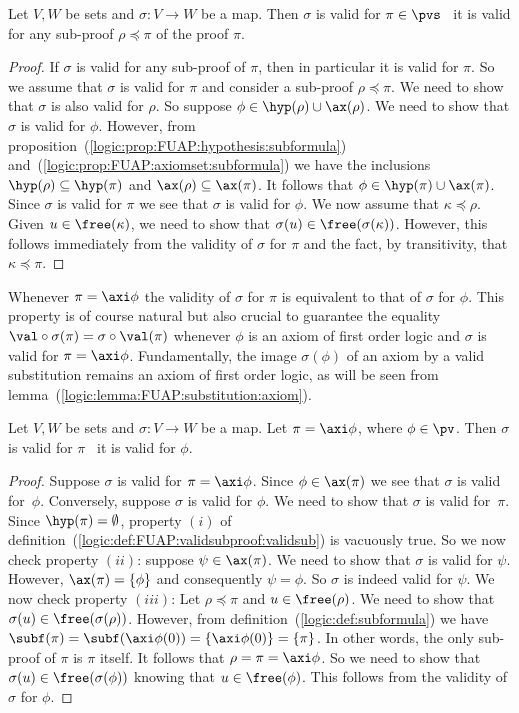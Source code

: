 \begin{prop}\label{logic:prop:FUAP:validsubproof:subformula}
Let $V, W$ be sets and $\sigma:V\to W$ be a map. Then $\sigma$ is
valid for $\pi\in\pvs$ \ifand\ it is valid for any sub-proof
$\rho\preceq\pi$ of the proof $\pi$.
\end{prop}
\begin{proof}
If $\sigma$ is valid for any sub-proof of $\pi$, then in particular
it is valid for $\pi$. So we assume that $\sigma$ is valid for $\pi$
and consider a sub-proof $\rho\preceq\pi$. We need to show that
$\sigma$ is also valid for $\rho$. So suppose
$\phi\in\hyp(\rho)\cup\ax(\rho)$. We need to show that $\sigma$ is
valid for $\phi$. However, from
proposition~(\ref{logic:prop:FUAP:hypothesis:subformula})
and~(\ref{logic:prop:FUAP:axiomset:subformula}) we have the
inclusions $\hyp(\rho)\subseteq\hyp(\pi)$  and
$\ax(\rho)\subseteq\ax(\pi)$. It follows that
$\phi\in\hyp(\pi)\cup\ax(\pi)$. Since $\sigma$ is valid for $\pi$ we
see that $\sigma$ is valid for $\phi$. We now assume that
$\kappa\preceq\rho$. Given $u\in\free(\kappa)$, we need to show that
$\sigma(u)\in\free(\sigma(\kappa))$. However, this follows
immediately from the validity of $\sigma$ for $\pi$ and the fact, by
transitivity, that $\kappa\preceq\pi$.
\end{proof}

Whenever $\pi=\axi\phi$ the validity of $\sigma$ for $\pi$ is
equivalent to that of $\sigma$ for $\phi$. This property is of
course natural but also crucial to guarantee the equality
$\val\circ\sigma(\pi)=\sigma\circ\val(\pi)$ whenever $\phi$ is an
axiom of first order logic and $\sigma$ is valid for $\pi=\axi\phi$.
Fundamentally, the image $\sigma(\phi)$ of an axiom by a valid
substitution remains an axiom of first order logic, as will be seen
from lemma~(\ref{logic:lemma:FUAP:substitution:axiom}).
\begin{prop}\label{logic:prop:FUAP:validsubproof:recursion:axiom}
Let $V, W$ be sets and $\sigma:V\to W$ be a map. Let $\pi=\axi\phi$,
where $\phi\in\pv$. Then $\sigma$ is valid for $\pi$ \ifand\ it is
valid for $\phi$.
\end{prop}
\begin{proof}
Suppose $\sigma$ is valid for $\pi=\axi\phi$. Since
$\phi\in\ax(\pi)$ we see that $\sigma$ is valid for~$\phi$.
Conversely, suppose $\sigma$ is valid for $\phi$. We need to show
that $\sigma$ is valid for~$\pi$. Since $\hyp(\pi)=\emptyset$,
property $(i)$ of
definition~(\ref{logic:def:FUAP:validsubproof:validsub}) is
vacuously true. So we now check property $(ii)$: suppose
$\psi\in\ax(\pi)$. We need to show that $\sigma$ is valid for
$\psi$. However, $\ax(\pi)=\{\phi\}$ and consequently $\psi=\phi$.
So $\sigma$ is indeed valid for $\psi$. We now check property
$(iii)$: Let $\rho\preceq\pi$ and $u\in\free(\rho)$. We need to show
that $\sigma(u)\in\free(\sigma(\rho))$. However, from
definition~(\ref{logic:def:subformula}) we have
$\subf(\pi)=\subf(\axi\phi(0))=\{\axi\phi(0)\}=\{\pi\}$. In other
words, the only sub-proof of $\pi$ is $\pi$ itself. It follows that
$\rho=\pi=\axi\phi$. So we need to show that
$\sigma(u)\in\free(\sigma(\phi))$ knowing that $u\in\free(\phi)$.
This follows from the validity of $\sigma$ for $\phi$.
\end{proof}

